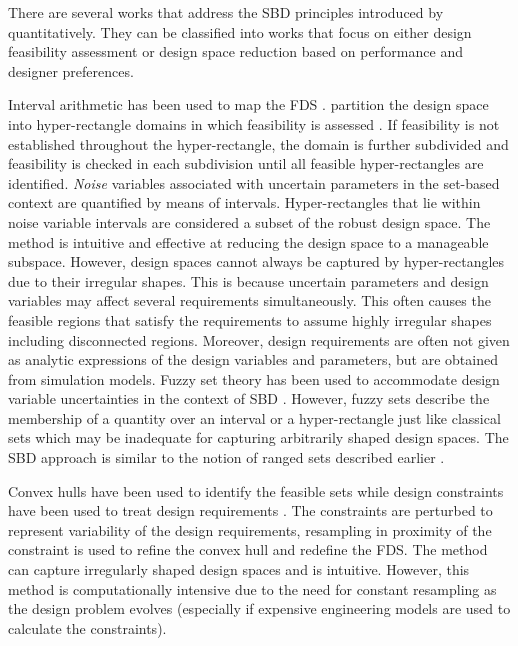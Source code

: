 There are several works that address the \ac{SBD} principles introduced by \citeauthor{SobekIi1999} quantitatively. They can be classified into works that focus on either design feasibility assessment or design space reduction based on performance and designer preferences.

Interval arithmetic has been used to map the \ac{FDS} \cite{Qureshi2014, Nahm2005}. \citeauthor{Qureshi2014} partition the design space into hyper-rectangle domains in which feasibility is assessed \cite{Qureshi2014}. If feasibility is not established throughout the hyper-rectangle, the domain is further subdivided and feasibility is checked in each subdivision until all feasible hyper-rectangles are identified. \textit{Noise} variables associated with uncertain parameters in the set-based context are quantified by means of intervals. Hyper-rectangles that lie within noise variable intervals are considered a subset of the robust design space. The method is intuitive and effective at reducing the design space to a manageable subspace. However, design spaces cannot always be captured by hyper-rectangles due to their irregular shapes. This is because uncertain parameters and design variables may affect several requirements simultaneously. This often causes the feasible regions that satisfy the requirements to assume highly irregular shapes including disconnected regions. Moreover, design requirements are often not given as analytic expressions of the design variables and parameters, but are obtained from simulation models. Fuzzy set theory has been used to accommodate design variable uncertainties in the context of \ac{SBD} \cite{Gventer1999}. However, fuzzy sets describe the membership of a quantity over an interval or a hyper-rectangle just like classical sets which may be inadequate for capturing arbitrarily shaped design spaces. The \ac{SBD} approach is similar to the notion of ranged sets described earlier \cite{Liu2008}.

Convex hulls have been used to identify the feasible sets while design constraints have been used to treat design requirements \cite{Kizer2014}. The constraints are perturbed to represent variability of the design requirements, resampling in proximity of the constraint is used to refine the convex hull and redefine the \ac{FDS}. The method can capture irregularly shaped design spaces and is intuitive. However, this method is computationally intensive due to the need for constant resampling as the design problem evolves (especially if expensive engineering models are used to calculate the constraints).


